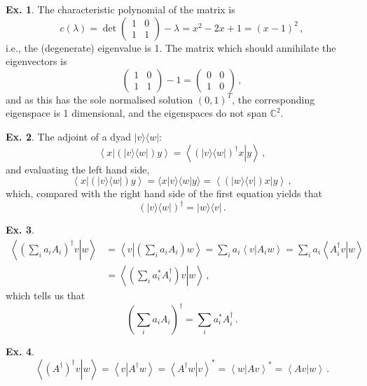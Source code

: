 \documentclass[a4paper,12pt]{article}
\theoremstyle{definition}
\newtheorem{exercise}{Ex.}[section]
\begin{document}
\begin{exercise}
 The characteristic polynomial of the matrix is
 \[
  c(\lambda)=\det\begin{pmatrix} 1 & 0 \\ 1 & 1\end{pmatrix}-\lambda = x^2-2x+1=(x-1)^2\,,
 \]
 i.e., the (degenerate) eigenvalue is 1. The matrix which should annihilate the eigenvectors is
 \[
  \begin{pmatrix} 1 & 0 \\ 1 & 1\end{pmatrix}-1=\begin{pmatrix} 0 & 0 \\ 1 & 0\end{pmatrix}\,,
 \]
 and as this has the sole normalised solution $(0, 1)^T$, the corresponding eigenspace is 1 dimensional, and the eigenspaces do not span $\mathbb{C}^2$.
\end{exercise}

\begin{exercise}
 The adjoint of a dyad $|v\rangle\langle w|$:
 \[
 \left\langle x\left| \left(|v\rangle\langle w|\right) y\right.\right\rangle = \left\langle\left. \left(|v\rangle\langle w|\right)^\dagger x \right| y\right\rangle\,,
 \]
 and evaluating the left hand side,
 \[
  \left\langle x\left| \left(|v\rangle\langle w|\right) y\right.\right\rangle = \langle x | v\rangle \langle w | y \rangle =
  \left\langle\left. \left( |w\rangle \langle v|\right) x \right| y \right\rangle\,,
 \]
 which, compared with the right hand side of the first equation yields that
\[
 \left(|v\rangle\langle w|\right)^\dagger = |w\rangle\langle v|\,.
\]
\end{exercise}

\begin{exercise}
 \[\begin{aligned}
  \left\langle \left. \left( \sum_i a_i A_i\right)^\dagger v \right| w\right\rangle &= \left\langle v \left| \left(\sum_i a_i A_i\right) w\right.\right\rangle = \sum_i a_i \left\langle v | A_i w\right\rangle = \sum_i a_i \left\langle \left. A_i^\dagger v \right| w\right\rangle\\ &= \left\langle \left. \left( \sum_i a_i^* A_i^\dagger\right) v\right| w\right\rangle\,,
 \end{aligned}\]
 which tells us that
 \[
  \left( \sum_i a_i A_i\right)^\dagger = \sum_i a_i^* A_i^\dagger\,.
 \]
\end{exercise}

\begin{exercise}
 \[
  \left\langle \left. \left(A^\dagger\right)^\dagger v \right| w\right\rangle = \left\langle v \left| A^\dagger w\right.\right\rangle = \left\langle \left. A^\dagger w \right| v\right\rangle^* = \left\langle w\left| A v\right.\right\rangle^* = \left\langle \left. A v \right| w\right\rangle\,.
 \]
\end{exercise}
\end{document}
